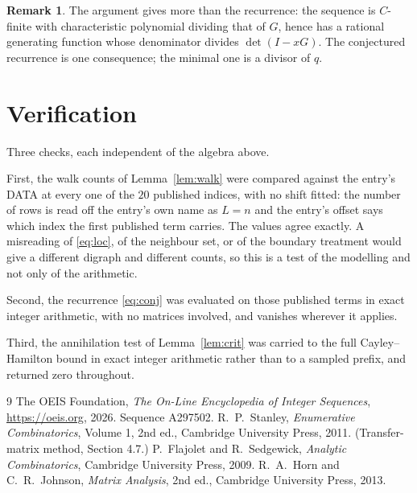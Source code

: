\documentclass[11pt,a4paper]{article}
\theoremstyle{plain}
\theoremstyle{definition}
\newtheorem{remark}[theorem]{Remark}
\begin{document}
\begin{remark}
The argument gives more than the recurrence: the sequence is $C$-finite with characteristic
polynomial dividing that of $G$, hence has a rational generating function whose denominator
divides $\det(I-xG)$. The conjectured recurrence is one consequence; the minimal one is a
divisor of $q$.
\end{remark}

\section{Verification}

Three checks, each independent of the algebra above.

First, the walk counts of Lemma~\ref{lem:walk} were compared against the entry's DATA at
every one of the $20$ published indices, with no shift fitted: the number of rows is
read off the entry's own name as $L=n$ and the entry's offset says which index the first
published term carries. The values agree exactly. A misreading of \eqref{eq:loc}, of the
neighbour set, or of the boundary treatment would give a different digraph and different
counts, so this is a test of the modelling and not only of the arithmetic.

Second, the recurrence \eqref{eq:conj} was evaluated on those published terms in exact
integer arithmetic, with no matrices involved, and vanishes wherever it applies.

Third, the annihilation test of Lemma~\ref{lem:crit} was carried to the full
Cayley--Hamilton bound in exact integer arithmetic rather than to a sampled prefix, and
returned zero throughout.

\begin{thebibliography}{9}
 The OEIS Foundation, \emph{The On-Line Encyclopedia of Integer
Sequences}, \url{https://oeis.org}, 2026. Sequence A297502.
 R.~P.~Stanley, \emph{Enumerative Combinatorics}, Volume 1, 2nd ed.,
Cambridge University Press, 2011. (Transfer-matrix method, Section 4.7.)
 P.~Flajolet and R.~Sedgewick, \emph{Analytic Combinatorics}, Cambridge
University Press, 2009.
 R.~A.~Horn and C.~R.~Johnson, \emph{Matrix Analysis}, 2nd ed., Cambridge
University Press, 2013.
\end{thebibliography}
\end{document}
